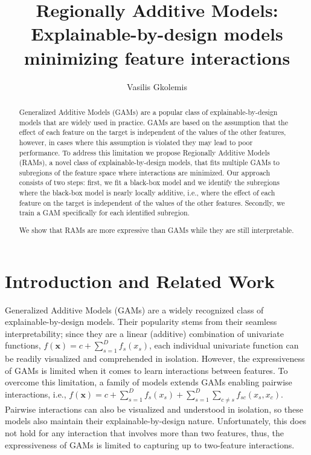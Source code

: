 \documentclass[12pt]{article}
\title{Regionally Additive Models: Explainable-by-design models minimizing feature interactions}
\author{Vasilis Gkolemis}
\newcommand{\xb}{\mathbf{x}}
\begin{document}
\maketitle

\begin{abstract}
Generalized Additive Models (GAMs) are a popular class of explainable-by-design models that are widely used in practice.
GAMs are based on the assumption that the effect of each feature on the target is independent of the values of the
other features, however, in cases where this assumption is violated they may lead to poor performance.
To address this limitation we propose Regionally Additive Models (RAMs), a novel class of explainable-by-design models,
that fits multiple GAMs to subregions of the feature space where interactions are minimized.
Our approach consists of two steps: first, we fit a black-box model and we identify the subregions where the black-box model is nearly locally additive,
i.e., where the effect of each feature on the target is independent of the values of the other features.
Secondly, we train a GAM specifically for each identified subregion.

We show that RAMs are more expressive than GAMs while they are still interpretable.

\end{abstract}

\section{Introduction and Related Work}


Generalized Additive Models (GAMs) are a widely recognized class of explainable-by-design models.
Their popularity stems from their seamless interpretability; since they are a linear (additive) combination of univariate functions,
$f(\xb) = c + \sum_{s=1}^D f_s(x_s)$, each individual univariate function can be readily visualized and comprehended in isolation.
However, the expressiveness of GAMs is limited when it comes to learn interactions between features.
To overcome this limitation, a family of models extends GAMs enabling pairwise interactions,
i.e., $f(\xb) = c + \sum_{s=1}^D f_s(x_s) + \sum_{s=1}^D \sum_{c \neq s} f_{sc}(x_s, x_c)$.
Pairwise interactions can also be visualized and understood in isolation, so these models also maintain their explainable-by-design nature.
Unfortunately, this does not hold for any interaction that involves more than two features, thus, the expressiveness of GAMs is limited to capturing up to two-feature interactions.
\end{document}
